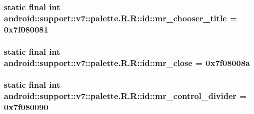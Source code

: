\hypertarget{classandroid_1_1support_1_1v7_1_1palette_1_1_r_1_1id_8d360f5cfa0b9fcd96df52b02bd129b9}{
\subsubsection[{mr\_\-chooser\_\-title}]{\setlength{\rightskip}{0pt plus 5cm}static final int android::support::v7::palette.R.R::id::mr\_\-chooser\_\-title = 0x7f080081}}
\label{classandroid_1_1support_1_1v7_1_1palette_1_1_r_1_1id_8d360f5cfa0b9fcd96df52b02bd129b9}


\hypertarget{classandroid_1_1support_1_1v7_1_1palette_1_1_r_1_1id_2d0f3ae3b41ec15b92d59e283091d914}{
\subsubsection[{mr\_\-close}]{\setlength{\rightskip}{0pt plus 5cm}static final int android::support::v7::palette.R.R::id::mr\_\-close = 0x7f08008a}}
\label{classandroid_1_1support_1_1v7_1_1palette_1_1_r_1_1id_2d0f3ae3b41ec15b92d59e283091d914}


\hypertarget{classandroid_1_1support_1_1v7_1_1palette_1_1_r_1_1id_43a2ea03974aa00b689b2c9edee50fda}{
\subsubsection[{mr\_\-control\_\-divider}]{\setlength{\rightskip}{0pt plus 5cm}static final int android::support::v7::palette.R.R::id::mr\_\-control\_\-divider = 0x7f080090}}
\label{classandroid_1_1support_1_1v7_1_1palette_1_1_r_1_1id_43a2ea03974aa00b689b2c9edee50fda}


